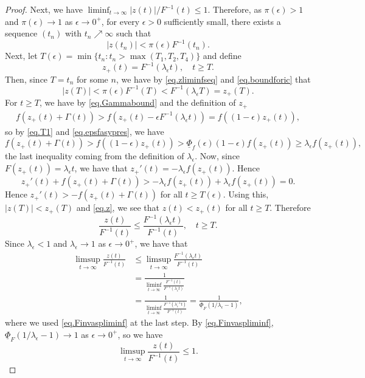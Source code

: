 \documentclass[a4paper,10pt,reqno]{amsart}
\numberwithin{equation}{section}
\theoremstyle{definition}
\theoremstyle{remark}
\DeclareMathOperator{\1}{\mathbbm 1}
\begin{document}
\begin{proof}
		Next, we have $\liminf_{t\to\infty} |z(t)|/F^{-1}(t)\leq 1$. Therefore, as $\pi(\epsilon)>1$ and $\pi(\epsilon)\to 1$ as $\epsilon\to 0^+$, for every $\epsilon>0$ sufficiently small, there exists a sequence $(t_n)$ with $t_n\nearrow\infty$ such that 
		\begin{equation} \label{eq.zliminfseq}
			|z(t_n)|<\pi(\epsilon) F^{-1}(t_n).
		\end{equation}
		Next, let $T(\epsilon)=\min\{t_n: t_n>\max(T_1,T_2,T_4)\}$ and define 
		\begin{equation} \label{eq.icforlimsup}
			z_+(t)=F^{-1}(\lambda_\epsilon t), \quad t\geq T.
		\end{equation}
		Then, since $T=t_n$ for some $n$, we have by  \eqref{eq.zliminfseq} and 
		\eqref{eq.boundforic} that 
		\[
		|z(T)|<\pi(\epsilon)F^{-1}(T)<F^{-1}(\lambda_\epsilon T)=z_+(T).
		\]
		For $t\geq T$, we have by \eqref{eq.Gammabound} and the definition of $z_+$
		\begin{align*}
			f(z_+(t)+\Gamma(t))>f(z_+(t)-\epsilon F^{-1}(\lambda_\epsilon t))
			=f((1-\epsilon)z_+(t)),
		\end{align*}
		so by \eqref{eq.T1} and \eqref{eq.epsfasypres}, we have 
		\[
		f(z_+(t)+\Gamma(t))>f((1-\epsilon)z_+(t))>\underline{\Phi}_f(\epsilon)(1-\epsilon)f(z_+(t))\geq \lambda_\epsilon f(z_+(t)),
		\]
		the last inequality coming from the definition of $\lambda_\epsilon$. 
		Now, since $F(z_+(t))=\lambda_\epsilon t$, we have that $z_+'(t)=-\lambda_\epsilon f(z_+(t))$. Hence 
		\[
		z_+'(t)+f(z_+(t)+\Gamma(t))> -\lambda_\epsilon f(z_+(t)) +\lambda_\epsilon f(z_+(t))=0.
		\]
		Hence $z_+'(t)>-f(z_+(t)+\Gamma(t))$ for all $t\geq T(\epsilon)$. Using this, $|z(T)|<z_+(T)$ and \eqref{eq.z}, we see that $z(t)< z_+(t)$ for all $t\geq T$. Therefore
		\[
		\frac{z(t)}{F^{-1}(t)}\leq \frac{F^{-1}(\lambda_\epsilon t)}{F^{-1}(t)}, \quad t\geq T.
		\] 
		Since $\lambda_\epsilon<1$ and $\lambda_\epsilon\to 1$ as $\epsilon\to 0^+$, we have that 
		\begin{align*}
			\limsup_{t\to\infty}\frac{z(t)}{F^{-1}(t)}&\leq \limsup_{t\to\infty} \frac{F^{-1}(\lambda_\epsilon t)}{F^{-1}(t)}\\
			&=\frac{1}{\liminf_{t\to\infty} \frac{F^{-1}(t)}{F^{-1}(\lambda_\epsilon t)}}\\
			&=\frac{1}{\liminf_{t\to\infty} \frac{F^{-1}(\lambda_\epsilon^{-1} t)}{F^{-1}(t)}}
			=\frac{1}{\underline{\Phi}_F(1/\lambda_\epsilon-1)},
		\end{align*}
		where we used \eqref{eq.Finvaspliminf} at the last step. By \eqref{eq.Finvaspliminf}, $\underline{\Phi}_F(1/\lambda_\epsilon-1)\to 1$ 
		as $\epsilon\to 0^+$, so we have 
		\begin{equation} \label{eq.limsupzlt1}
			\limsup_{t\to\infty}\frac{z(t)}{F^{-1}(t)}\leq 1.
		\end{equation}
		

\end{proof}
\end{document}
